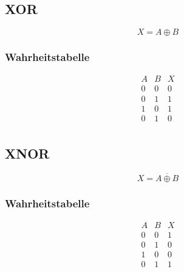 \subsection{XOR}
\[ X = A \oplus B \]
\subsubsection{Wahrheitstabelle}
\begin{table}[h!]
\[ \begin{array}{cc|c}
A&B&X\\
\hline
0&0&0\\
0&1&1\\
1&0&1\\
0&1&0\\
\end{array} \]
\end{table}

\subsection{XNOR}
\[ X = \overline{A \oplus B} \]
\subsubsection{Wahrheitstabelle}
\begin{table}[h!]
\[ \begin{array}{cc|c}
A&B&X\\
\hline
0&0&1\\
0&1&0\\
1&0&0\\
0&1&1\\
\end{array} \]
\end{table}
